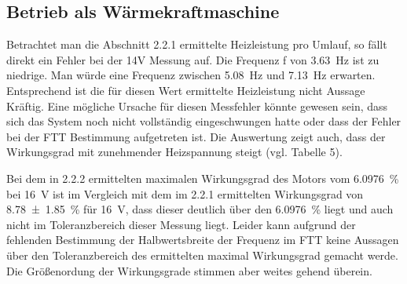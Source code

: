 \subsection{Betrieb als Wärmekraftmaschine}
Betrachtet man die Abschnitt 2.2.1 ermittelte Heizleistung pro Umlauf, so fällt direkt ein Fehler bei der 14V Messung auf. Die Frequenz f von \SI{3.63}{Hz} ist zu niedrige. Man würde eine Frequenz zwischen \SI{5.08}{Hz} und \SI{7.13}{Hz} erwarten. Entsprechend ist die für diesen Wert ermittelte Heizleistung nicht Aussage Kräftig. Eine mögliche Ursache für diesen Messfehler könnte gewesen sein, dass sich das System noch nicht vollständig eingeschwungen hatte oder dass der Fehler bei der FTT Bestimmung aufgetreten ist. Die Auswertung zeigt auch, dass der Wirkungsgrad mit zunehmender Heizspannung steigt (vgl. Tabelle 5).

Bei dem in 2.2.2 ermittelten maximalen Wirkungsgrad des Motors vom \SI{6.0976}{\percent} bei \SI{16}{V} ist im Vergleich mit dem im 2.2.1 ermittelten Wirkungsgrad von \SI{8.78(185)}{\percent} für \SI{16}{V}, dass dieser deutlich über den \SI{6.0976}{\percent} liegt und auch nicht im Toleranzbereich dieser Messung liegt. Leider kann aufgrund der fehlenden Bestimmung der Halbwertsbreite der Frequenz im FTT keine Aussagen über den Toleranzbereich des ermittelten maximal Wirkungsgrad gemacht werde. Die Größenordung der Wirkungsgrade stimmen aber weites gehend überein.